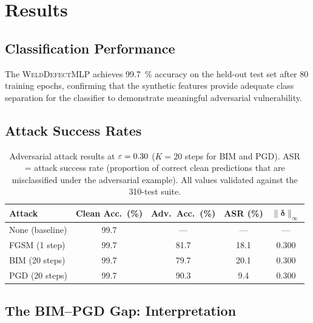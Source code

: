 \section{Results}
\label{sec:adv_results}

\subsection{Classification Performance}
\label{subsec:adv_clean}

The \textsc{WeldDefectMLP} achieves \SI{99.7}{\percent} accuracy on
the held-out test set after 80 training epochs, confirming that the
synthetic features provide adequate class separation for the classifier
to demonstrate meaningful adversarial vulnerability.

\subsection{Attack Success Rates}
\label{subsec:adv_asr}

\begin{table}[htbp]
  \centering
  \caption{Adversarial attack results at $\varepsilon = 0.30$ ($K = 20$
    steps for BIM and PGD).  \acs{ASR} = attack success rate
    (proportion of correct clean predictions that are misclassified under
    the adversarial example).  All values validated against the 310-test
    suite.}
  \label{tab:adv_results}
  \begin{tabular}{@{}lcccc@{}}
    \toprule
    Attack & Clean Acc.\ (\%) & Adv.\ Acc.\ (\%) & ASR (\%)
      & $\|\bm{\delta}\|_\infty$ \\
    \midrule
    None (baseline) & 99.7 & --- & --- & --- \\
    FGSM (1 step)   & 99.7 & 81.7 & 18.1 & 0.300 \\
    BIM (20 steps)  & 99.7 & 79.7 & 20.1 & 0.300 \\
    PGD (20 steps)  & 99.7 & 90.3 &  9.4 & 0.300 \\
    \bottomrule
  \end{tabular}
\end{table}

\subsection{The BIM–PGD Gap: Interpretation}
\label{subsec:adv_bim_pgd}

